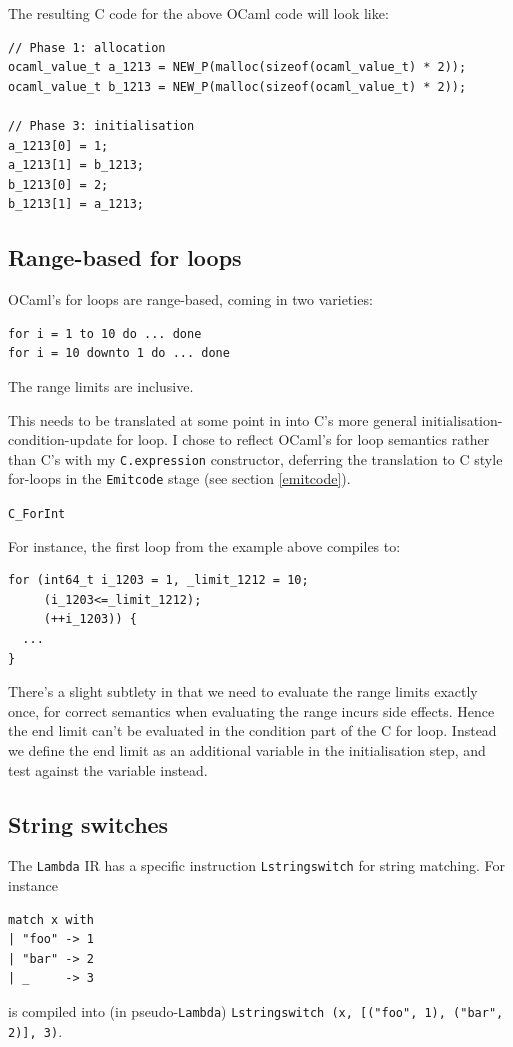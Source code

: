 \documentclass[12pt,a4paper,twoside,openright]{report}
\begin{document}
The resulting C code for the above OCaml code will look like:

\begin{lstlisting}
// Phase 1: allocation
ocaml_value_t a_1213 = NEW_P(malloc(sizeof(ocaml_value_t) * 2));
ocaml_value_t b_1213 = NEW_P(malloc(sizeof(ocaml_value_t) * 2));

// Phase 3: initialisation
a_1213[0] = 1;
a_1213[1] = b_1213;
b_1213[0] = 2;
b_1213[1] = a_1213;
\end{lstlisting}

\subsection{Range-based for loops}\label{for-loops}

OCaml's for loops are range-based, coming in two varieties:
\begin{lstlisting}
for i = 1 to 10 do ... done
for i = 10 downto 1 do ... done
\end{lstlisting}

The range limits are inclusive.

This needs to be translated at some point in into C's more general
initialisation-condition-update for loop. I chose to reflect OCaml's for loop
semantics rather than C's with my \lstinline!C.expression!
constructor, deferring the translation to C style for-loops in the
\lstinline!Emitcode! stage (see section \ref{emitcode}).

\lstinline!C_ForInt!

For instance, the first loop from the example above
compiles to:

\begin{lstlisting}
for (int64_t i_1203 = 1, _limit_1212 = 10;
     (i_1203<=_limit_1212);
     (++i_1203)) {
  ...
}
\end{lstlisting}

There's a slight subtlety in that we need to evaluate the range limits exactly
once, for correct semantics when evaluating the range incurs side effects.
Hence the end limit can't be evaluated in the condition part of the C for loop.
Instead we define the end limit as an additional variable in the initialisation
step, and test against the variable instead.

\subsection{String switches}\label{stringswitch}

The \lstinline!Lambda! IR has a specific instruction \lstinline!Lstringswitch!
for string matching. For instance
\begin{lstlisting}
match x with
| "foo" -> 1
| "bar" -> 2
| _     -> 3\end{lstlisting}
is compiled into (in pseudo-\lstinline!Lambda!)
\lstinline!Lstringswitch (x, [("foo", 1), ("bar", 2)], 3)!.
\end{document}
